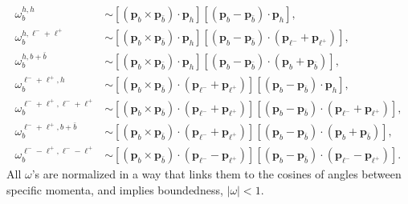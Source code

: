 \documentclass[11pt,a4paper]{article}
\newcommand{\lp}{\bm{p}_{\ell^+}}
\newcommand{\lm}{\bm{p}_{\ell^-}}
\renewcommand{\b}{\bm{p}_b}
\newcommand{\bbar}{\bm{p}_{\bar{b}}}
\newcommand{\h}{\bm{p}_h}
\begin{document}
  \begin{align}
      \omega_{b}^{h,h} &\sim \left[(\b \times \bbar) \cdot \h \right] \left[(\b - \bbar)\cdot \h\right],\\
      \omega_{b}^{h, \ell^- + \ell^+} &\sim \left[(\b \times \bbar) \cdot \h \right] \left[(\b - \bbar)\cdot (\lm+\lp)\right],\\
      \omega_{b}^{h, b+\bar b} &\sim \left[(\b \times \bbar) \cdot \h \right] \left[(\b - \bbar)\cdot (\b+\bbar)\right],\\
      \omega_{b}^{\ell^-+\ell^+, h} &\sim \left[(\b \times \bbar) \cdot (\lm+\lp) \right] \left[(\b - \bbar)\cdot \h\right],\\
      \omega_{b}^{\ell^-+\ell^+,\ell^-+\ell^+} &\sim \left[(\b \times \bbar) \cdot (\lm+\lp) \right] \left[(\b - \bbar)\cdot (\lm+\lp)\right],\\
      \omega_{b}^{\ell^-+\ell^+,b+\bar b} &\sim \left[(\b \times \bbar) \cdot (\lm+\lp) \right] \left[(\b - \bbar)\cdot (\b+\bbar)\right],\\
      \omega_{b}^{\ell^- - \ell^+,\ell^- - \ell^+} &\sim \left[(\b \times \bbar) \cdot (\lm-\lp) \right] \left[(\b - \bbar)\cdot (\lm-\lp)\right].
\end{align}
All $\omega$'s are normalized in a way that links them to the cosines of angles between specific momenta, and implies boundedness, $|\omega| < 1$.



{}
\end{document}
